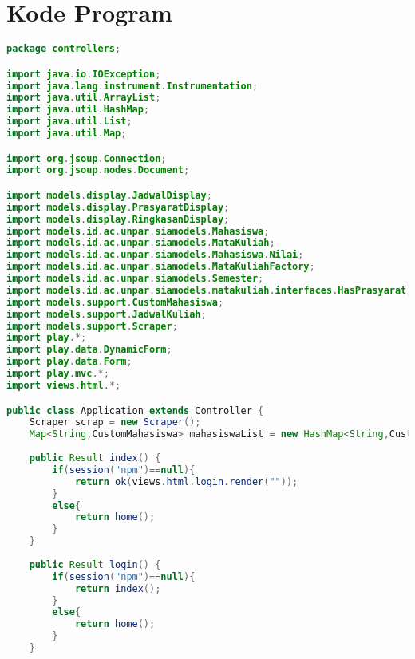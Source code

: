 \chapter{Kode Program}

\singlespacing 
%
%
\begin{lstlisting}[language=Java,basicstyle=\tiny,caption=Application.java]
package controllers;

import java.io.IOException;
import java.lang.instrument.Instrumentation;
import java.util.ArrayList;
import java.util.HashMap;
import java.util.List;
import java.util.Map;

import org.jsoup.Connection;
import org.jsoup.nodes.Document;

import models.display.JadwalDisplay;
import models.display.PrasyaratDisplay;
import models.display.RingkasanDisplay;
import models.id.ac.unpar.siamodels.Mahasiswa;
import models.id.ac.unpar.siamodels.MataKuliah;
import models.id.ac.unpar.siamodels.Mahasiswa.Nilai;
import models.id.ac.unpar.siamodels.MataKuliahFactory;
import models.id.ac.unpar.siamodels.Semester;
import models.id.ac.unpar.siamodels.matakuliah.interfaces.HasPrasyarat;
import models.support.CustomMahasiswa;
import models.support.JadwalKuliah;
import models.support.Scraper;
import play.*;
import play.data.DynamicForm;
import play.data.Form;
import play.mvc.*;
import views.html.*;

public class Application extends Controller {
	Scraper scrap = new Scraper();
	Map<String,CustomMahasiswa> mahasiswaList = new HashMap<String,CustomMahasiswa>();
	
    public Result index() {
    	if(session("npm")==null){
    		return ok(views.html.login.render(""));
    	}
    	else{
    		return home();
    	}
    }
    
    public Result login() {
    	if(session("npm")==null){
    		return index();
    	}
    	else{
    		return home();
    	}
    }
    

\end{lstlisting}
